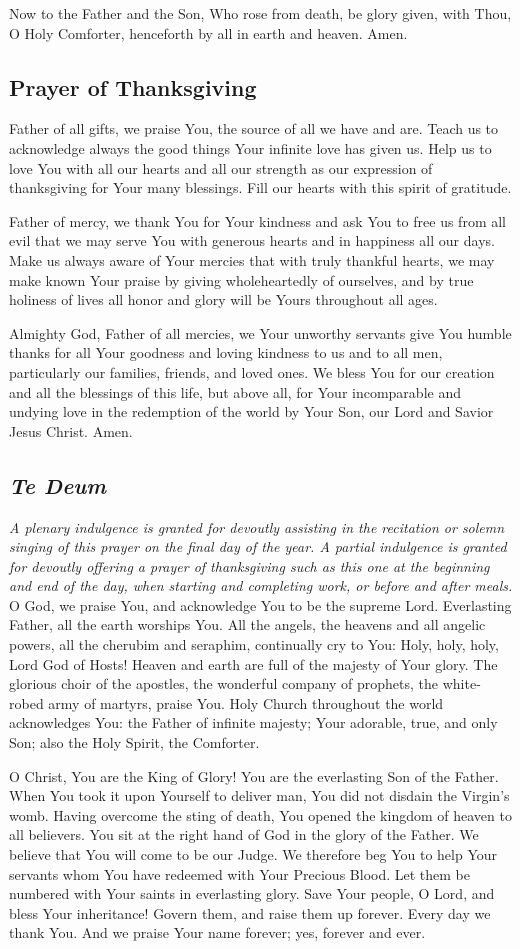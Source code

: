 \documentclass[12pt]{article}
\newcommand{\prayertitle}[1]{\subsection{#1}}
\newcommand{\indulgencedprayertitle}[1]{\prayertitle{#1 \protect\kreuz}}
\newcommand{\foreign}[1]{\textsl{#1}}
\newcommand{\note}[1]{{\small{\textsl{#1}}}\newline}
\begin{document}
Now to the Father and the Son,
Who rose from death, be glory given,
with Thou, O Holy Comforter,
henceforth by all in earth and heaven.
Amen.

\prayertitle{Prayer of Thanksgiving}
Father of all gifts, we praise You, the source of all we have and are.
Teach us to acknowledge always the good things Your infinite love has given us.
Help us to love You with all our hearts and all our strength as our expression of thanksgiving for Your many blessings.
Fill our hearts with this spirit of gratitude.

Father of mercy, we thank You for Your kindness and ask You to free us from all evil that we may serve You with generous hearts and in happiness all our days.
Make us always aware of Your mercies that with truly thankful hearts, we may make known Your praise by giving wholeheartedly of ourselves, and by true holiness of lives all honor and glory will be Yours throughout all ages.

Almighty God, Father of all mercies, we Your unworthy servants give You humble thanks for all Your goodness and loving kindness to us and to all men, particularly our families, friends, and loved ones.
We bless You for our creation and all the blessings of this life, but above all, for Your incomparable and undying love in the redemption of the world by Your Son, our Lord and Savior Jesus Christ.
Amen.
\newpage
\indulgencedprayertitle{\foreign{Te Deum}}
\note{A plenary indulgence is granted for devoutly assisting in the recitation or solemn singing of this prayer on the final day of the year.
A partial indulgence is granted for devoutly offering a prayer of thanksgiving such as this one at the beginning and end of the day, when starting and completing work, or before and after meals.}
O God, we praise You, and acknowledge You to be the supreme Lord.
Everlasting Father, all the earth worships You.
All the angels, the heavens and all angelic powers, all the cherubim and seraphim, continually cry to You:
Holy, holy, holy, Lord God of Hosts!
Heaven and earth are full of the majesty of Your glory.
The glorious choir of the apostles, the wonderful company of prophets, the white-robed army of martyrs, praise You.
Holy Church throughout the world acknowledges You:
the Father of infinite majesty;
Your adorable, true, and only Son;
also the Holy Spirit, the Comforter.

O Christ, You are the King of Glory!
You are the everlasting Son of the Father.
When You took it upon Yourself to deliver man, You did not disdain the Virgin's womb.
Having overcome the sting of death, You opened the kingdom of heaven to all believers.
You sit at the right hand of God in the glory of the Father.
We believe that You will come to be our Judge.
We therefore beg You to help Your servants whom You have redeemed with Your Precious Blood.
Let them be numbered with Your saints in everlasting glory.
Save Your people, O Lord, and bless Your inheritance!
Govern them, and raise them up forever.
Every day we thank You.
And we praise Your name forever;
yes, forever and ever.
\end{document}
